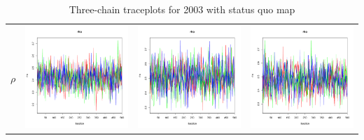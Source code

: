 \documentclass[letter,12pt]{article}
\begin{document}
\begin{table}
\begin{tabular}{cccc}
    $\rho$           & \includegraphics[width=.15\columnwidth]{../graphs/traceplots/2003d97v_7.pdf} &
                        \includegraphics[width=.15\columnwidth]{../graphs/traceplots/2003d97vbar_7.pdf} &
                         \includegraphics[width=.15\columnwidth]{../graphs/traceplots/2003d97wbar_7.pdf} \\
\end{tabular}
\caption{Three-chain traceplots for 2003 with status quo map}\label{T:traceplotStart}
\end{table}
\end{document}

